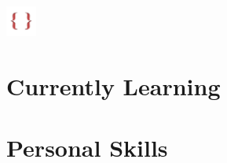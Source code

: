 \documentclass[11pt,a4paper,cambria]{moderncv}
\begin{document}
\begin{multicols}{3}
\cvitem {}
{\includegraphics[width=1cm,height=1cm]{LatexLogo}}
\end{multicols}

\begin{multicols}{3}
\end{multicols}

\begin{multicols}{3}
\end{multicols}

\section{\textbf{Currently Learning}}
\renewcommand{\listitemsymbol}{-~}
 \begin{multicols}{3}
 \end{multicols}

\newpage
\section*{Personal Skills}
\renewcommand{\listitemsymbol}{-~}
\setlength{\columnsep}{1pt}
\begin{multicols}{3}
\end{multicols}

\begin{multicols}{3}
\end{multicols}

\end{document}
